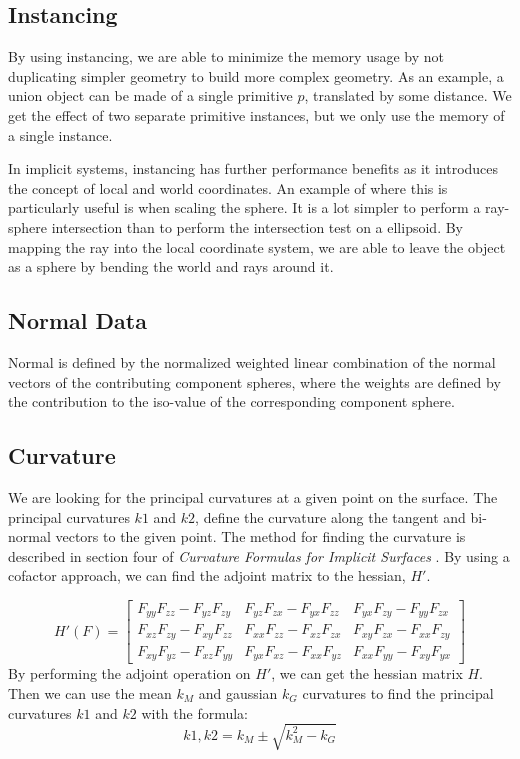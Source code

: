 \documentclass[conference]{acmsiggraph}
\begin{document}
\subsection{Instancing}
By using instancing, we are able to minimize the memory usage by not
duplicating simpler geometry to build more complex geometry. As an example, a
union object can be made of a single primitive $p$, translated by some
distance. We get the effect of two separate primitive instances, but we only
use the memory of a single instance.

In implicit systems, instancing has further performance benefits as it
introduces the concept of local and world coordinates. An example of where this
is particularly useful is when scaling the sphere. It is a lot simpler to
perform a ray-sphere intersection than to perform the intersection test on a
ellipsoid. By mapping the ray into the local coordinate system, we are able to
leave the object as a sphere by bending the world and rays around it.

\subsection{Normal Data}
Normal is defined by the normalized weighted linear combination of the normal
vectors of the contributing component spheres, where the weights are defined by
the contribution to the iso-value of the corresponding component
sphere\cite{Wyvill}.

\subsection{Curvature}
We are looking for the principal curvatures at a given point on the surface.
The principal curvatures $k1$ and $k2$, define the curvature along the tangent
and bi-normal vectors to the given point. The method for finding the curvature
is described in section four of \textit{Curvature Formulas for Implicit
Surfaces} \cite{Goldman2005}. By using a cofactor approach, we can find the adjoint matrix to the
hessian, $H'$.

$$
H'(F) =
\begin{bmatrix}
	F_{yy}F_{zz} - F_{yz}F_{zy} & F_{yz}F_{zx} - F_{yx}F_{zz} & F_{yx}F_{zy} - F_{yy}F_{zx} \\
	F_{xz}F_{zy} - F_{xy}F_{zz} & F_{xx}F_{zz} - F_{xz}F_{zx} & F_{xy}F_{zx} - F_{xx}F_{zy} \\
	F_{xy}F_{yz} - F_{xz}F_{yy} & F_{yx}F_{xz} - F_{xx}F_{yz} & F_{xx}F_{yy} - F_{xy}F_{yx}
\end{bmatrix}
$$
By performing the adjoint operation on $H'$, we can get the
hessian matrix $H$. Then we can use the mean $k_M$ and gaussian $k_G$
curvatures to find
the principal curvatures $k1$ and $k2$ with the formula:
$$k1, k2 = k_M \pm \sqrt{k^2_{M} - k_G}$$
\end{document}
